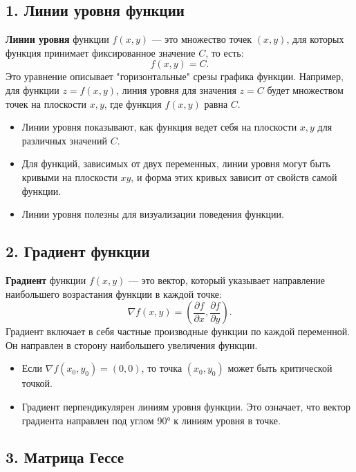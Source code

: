\documentclass[a4paper,12pt]{article}
\begin{document}
\subsection*{1. Линии уровня функции}

\textbf{Линии уровня} функции \( f(x, y) \) — это множество точек \( (x, y) \), для которых функция принимает фиксированное значение \( C \), то есть:
\[
f(x, y) = C.
\]
Это уравнение описывает "горизонтальные" срезы графика функции. Например, для функции \( z = f(x, y) \), линия уровня для значения \( z = C \) будет множеством точек на плоскости \( x, y \), где функция \( f(x, y) \) равна \( C \).

\begin{itemize}
    \item Линии уровня показывают, как функция ведет себя на плоскости \( x, y \) для различных значений \( C \).
    \item Для функций, зависимых от двух переменных, линии уровня могут быть кривыми на плоскости \( xy \), и форма этих кривых зависит от свойств самой функции.
    \item Линии уровня полезны для визуализации поведения функции.
\end{itemize}

\subsection*{2. Градиент функции}

\textbf{Градиент} функции \( f(x, y) \) — это вектор, который указывает направление наибольшего возрастания функции в каждой точке:
\[
\nabla f(x, y) = \left( \frac{\partial f}{\partial x}, \frac{\partial f}{\partial y} \right).
\]
Градиент включает в себя частные производные функции по каждой переменной. Он направлен в сторону наибольшего увеличения функции.

\begin{itemize}
    \item Если \( \nabla f(x_0, y_0) = (0, 0) \), то точка \( (x_0, y_0) \) может быть критической точкой.
    \item Градиент перпендикулярен линиям уровня функции. Это означает, что вектор градиента направлен под углом 90° к линиям уровня в точке.
\end{itemize}

\subsection*{3. Матрица Гессе}
\end{document}
